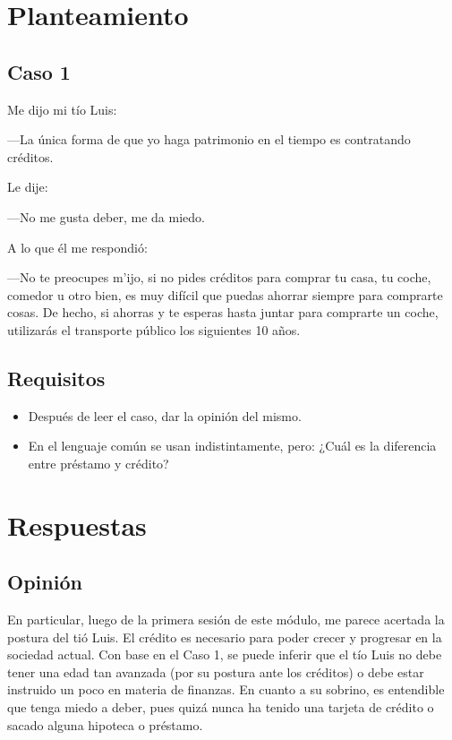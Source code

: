 \documentclass[12pt]{article}
\begin{document}
    
    \section{Planteamiento}
        \subsection{Caso 1}
            Me dijo mi tío Luis:
            
            ---La única forma de que yo haga patrimonio en el tiempo es contratando créditos.
            
            Le dije: 
            
            ---No me gusta deber, me da miedo.
            
            A lo que él me respondió:
            
            ---No te preocupes m'ijo, si no pides créditos para comprar tu casa, tu coche, comedor u otro bien, es muy difícil que puedas ahorrar siempre para comprarte cosas. De hecho, si ahorras y te esperas hasta juntar para comprarte un coche, utilizarás el transporte público los siguientes 10 años.
        \subsection{Requisitos}
            \begin{itemize}
                \item Después de leer el caso, dar la opinión del mismo.
                \item En el lenguaje común se usan indistintamente, pero: ¿Cuál es la diferencia entre préstamo y crédito?
            \end{itemize}
    \section{Respuestas}
        \subsection{Opinión}
            En particular, luego de la primera sesión de este módulo, me parece acertada la postura del tió Luis. El crédito es necesario para poder crecer y progresar en la sociedad actual. Con base en el Caso 1, se puede inferir que el tío Luis no debe tener una edad tan avanzada (por su postura ante los créditos) o debe estar instruido un poco en materia de finanzas. En cuanto a su sobrino, es entendible que tenga miedo a deber, pues quizá nunca ha tenido una tarjeta de crédito o sacado alguna hipoteca o préstamo.
            
\end{document}
